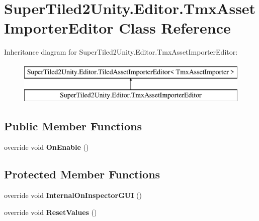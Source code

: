 \hypertarget{class_super_tiled2_unity_1_1_editor_1_1_tmx_asset_importer_editor}{}\section{Super\+Tiled2\+Unity.\+Editor.\+Tmx\+Asset\+Importer\+Editor Class Reference}
\label{class_super_tiled2_unity_1_1_editor_1_1_tmx_asset_importer_editor}
Inheritance diagram for Super\+Tiled2\+Unity.\+Editor.\+Tmx\+Asset\+Importer\+Editor\+:\begin{figure}[H]
\begin{center}
\leavevmode
\includegraphics[height=2.000000cm]{class_super_tiled2_unity_1_1_editor_1_1_tmx_asset_importer_editor}
\end{center}
\end{figure}
\subsection*{Public Member Functions}
\begin{DoxyCompactItemize}
\item 
\mbox{\label{class_super_tiled2_unity_1_1_editor_1_1_tmx_asset_importer_editor_a94c8a5d8841ea4b3f5b17a7bc5c5683b}} 
override void {\bfseries On\+Enable} ()
\end{DoxyCompactItemize}
\subsection*{Protected Member Functions}
\begin{DoxyCompactItemize}
\item 
\mbox{\label{class_super_tiled2_unity_1_1_editor_1_1_tmx_asset_importer_editor_a78b6c6e78652c5750b73e5eada764730}} 
override void {\bfseries Internal\+On\+Inspector\+G\+UI} ()
\item 
\mbox{\label{class_super_tiled2_unity_1_1_editor_1_1_tmx_asset_importer_editor_a02b2fdce17d618f00121a09ec9be26a3}} 
override void {\bfseries Reset\+Values} ()
\end{DoxyCompactItemize}
